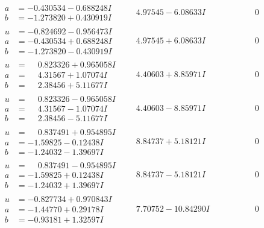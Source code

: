 \documentclass[1p]{elsarticle_modified}
\theoremstyle{definition}
\begin{document}
$$\begin{array}{c|c|c}
\begin{aligned}
a &= -0.430534 - 0.688248 I \\
b &= -1.273820 + 0.430919 I\end{aligned}
 & \phantom{-}4.97545 - 6.08633 I & \phantom{-0.000000 } 0 \\ \hline\begin{aligned}
u &= -0.824692 - 0.956473 I \\
a &= -0.430534 + 0.688248 I \\
b &= -1.273820 - 0.430919 I\end{aligned}
 & \phantom{-}4.97545 + 6.08633 I & \phantom{-0.000000 } 0 \\ \hline\begin{aligned}
u &= \phantom{-}0.823326 + 0.965058 I \\
a &= \phantom{-}4.31567 + 1.07074 I \\
b &= \phantom{-}2.38456 + 5.11677 I\end{aligned}
 & \phantom{-}4.40603 + 8.85971 I & \phantom{-0.000000 } 0 \\ \hline\begin{aligned}
u &= \phantom{-}0.823326 - 0.965058 I \\
a &= \phantom{-}4.31567 - 1.07074 I \\
b &= \phantom{-}2.38456 - 5.11677 I\end{aligned}
 & \phantom{-}4.40603 - 8.85971 I & \phantom{-0.000000 } 0 \\ \hline\begin{aligned}
u &= \phantom{-}0.837491 + 0.954895 I \\
a &= -1.59825 - 0.12438 I \\
b &= -1.24032 - 1.39697 I\end{aligned}
 & \phantom{-}8.84737 + 5.18121 I & \phantom{-0.000000 } 0 \\ \hline\begin{aligned}
u &= \phantom{-}0.837491 - 0.954895 I \\
a &= -1.59825 + 0.12438 I \\
b &= -1.24032 + 1.39697 I\end{aligned}
 & \phantom{-}8.84737 - 5.18121 I & \phantom{-0.000000 } 0 \\ \hline\begin{aligned}
u &= -0.827734 + 0.970843 I \\
a &= -1.44770 + 0.29178 I \\
b &= -0.93181 + 1.32597 I\end{aligned}
 & \phantom{-}7.70752 - 10.84290 I & \phantom{-0.000000 } 0 \\ \hline\begin{aligned}

\end{aligned}
\end{array}$$
\end{document}
